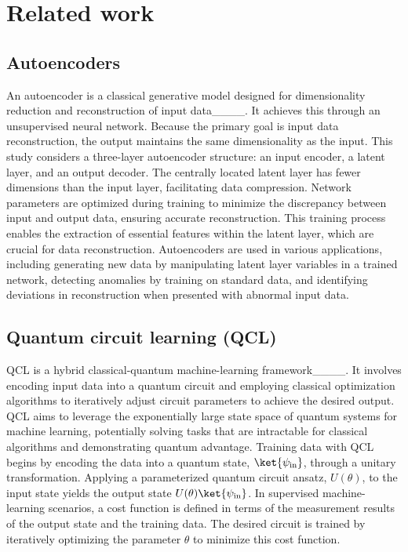 \section{Related work}
\label{sec2}

\subsection{Autoencoders}
An autoencoder is a classical generative model designed for dimensionality reduction and reconstruction of input data____. It achieves this through an unsupervised neural network. Because the primary goal is input data reconstruction, the output maintains the same dimensionality as the input. This study considers a three-layer autoencoder structure: an input encoder, a latent layer, and an output decoder. The centrally located latent layer has fewer dimensions than the input layer, facilitating data compression. Network parameters are optimized during training to minimize the discrepancy between input and output data, ensuring accurate reconstruction. This training process enables the extraction of essential features within the latent layer, which are crucial for data reconstruction. Autoencoders are used in various applications, including generating new data by manipulating latent layer variables in a trained network, detecting anomalies by training on standard data, and identifying deviations in reconstruction when presented with abnormal input data.

\subsection{Quantum circuit learning (QCL)}
QCL is a hybrid classical-quantum machine-learning framework____. It involves encoding input data into a quantum circuit and employing classical optimization algorithms to iteratively adjust circuit parameters to achieve the desired output. QCL aims to leverage the exponentially large state space of quantum systems for machine learning, potentially solving tasks that are intractable for classical algorithms and demonstrating quantum advantage. Training data with QCL begins by encoding the data into a quantum state, $\ket{\psi_{\text{in}}}$, through a unitary transformation. Applying a parameterized quantum circuit ansatz, $U(\theta)$, to the input state yields the output state $U(\theta)\ket{\psi_{\text{in}}}$. In supervised machine-learning scenarios, a cost function is defined in terms of the measurement results of the output state and the training data. The desired circuit is trained by iteratively optimizing the parameter $\theta$ to minimize this cost function.

